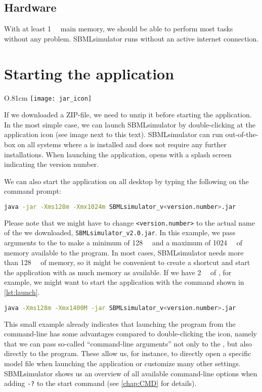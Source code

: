 \subsection{Hardware}

With at least \SI{1}{\giga\byte} main memory, we should be able to perform most tasks
without any problem.
SBMLsimulator runs without an active internet connection.

\section{Starting the application}
\label{startingTheProgram}

\begin{wrapfigure}{O}{.81cm}
\vspace{\wrapfigspace}
\texttt{[image: jar\_icon]}
\end{wrapfigure}
If we downloaded a ZIP-file, we need to unzip it before starting the application.
In the most simple case, we can launch SBMLsimulator by double-clicking at the \Java application icon (see image next to this text).
SBMLsimulator can run out-of-the-box on all systems where a \JVM is installed and does not require any further installations.
When launching the application, opens with a splash screen indicating the version number.

We can also start the application on all desktop \OS by typing the following on the command prompt:
\begin{lstlisting}[language=bash,numbers=none]
  java -jar -Xms128m -Xmx1024m SBMLsimulator_v<version.number>.jar
\end{lstlisting}
Please note that we might have to change
\texttt{<version.number>} to the actual name of the \JAR we downloaded, \eg \texttt{SBMLsimulator\_v2.0.jar}.
In this example, we pass arguments to the \JVM to make a minimum of \SI{128}{\mega\byte} and a maximum of \SI{1024}{\mega\byte} of memory available to the program.
In most cases, SBMLsimulator needs more than \SI{128}{\mega\byte} of memory, so it might be convenient to create a shortcut and start the application with as much memory as available.
If we have \SI{2}{\giga\byte} of \RAM, for example, we might want to start the application with the command shown in \cref{lst:launch}.
\begin{lstlisting}[language=bash,numbers=none,captionpos=t,float=b,caption={Launching SBMLsimulator from the command-line with additional memory},label={lst:launch}]
  java -Xms128m -Xmx1400M -jar SBMLsimulator_v<version.number>.jar
\end{lstlisting}
This small example already indicates that launching the program from the command-line has some advantages compared to double-clicking the icon, namely that we can pass so-called ``command-line arguments'' not only to the \JVM, but also directly to the program.
These allow us, for instance, to directly open a specific model file when launching the application or customize many other settings.
SBMLsimulator shows us an overview of all available command-line options when adding \texttt{-?} to the start command (see \cref{chap:CMD} for details).

